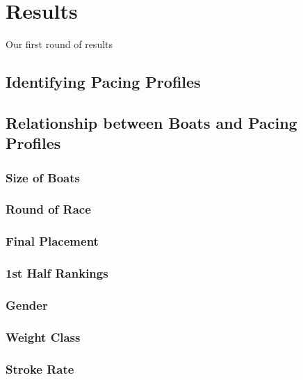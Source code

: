 \documentclass[11pt,]{article}
\begin{document}
\section{Results}\label{results}

Our first round of results

\subsection{Identifying Pacing
Profiles}\label{identifying-pacing-profiles}

\subsection{Relationship between Boats and Pacing
Profiles}\label{relationship-between-boats-and-pacing-profiles}

\subsubsection{Size of Boats}\label{size-of-boats}

\subsubsection{Round of Race}\label{round-of-race}

\subsubsection{Final Placement}\label{final-placement}

\subsubsection{1st Half Rankings}\label{st-half-rankings}

\subsubsection{Gender}\label{gender}

\subsubsection{Weight Class}\label{weight-class}

\subsubsection{Stroke Rate}\label{stroke-rate}
\end{document}
